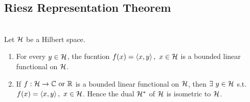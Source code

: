 \vspace{12pt}
\subsection{Riesz Representation Theorem}

\begin{theorem}\label{RRT}\ \\
Let $\mathcal{H}$ be a Hilbert space.
\begin{enumerate}[label = (\alph*)]
    \item For every $y \in \mathcal{H}$, the fucntion $f(x) = \left\langle x, y \right\rangle,\ x \in \mathcal{H}$ is a bounded linear functional on $\mathcal{H}$.
    \item If $f: \mathcal{H} \to \mathbb{C} \text{ or } \mathbb{R}$ is a bounded linear functional on $\mathcal{H}$, then $\exists\ y \in \mathcal{H}$ s.t. $f(x) = \left\langle x, y \right\rangle,\ x\in \mathcal{H}$. Hence the dual $\mathcal{H}^*$ of $\mathcal{H}$ is isometric to $\mathcal{H}$.
\end{enumerate}
\end{theorem}
